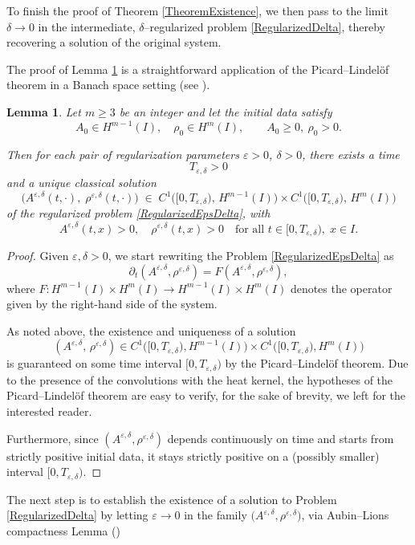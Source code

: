 \documentclass[12pt]{amsart}
\newtheorem{lemma}{Lemma}
\begin{document}
To finish the proof of Theorem \ref{TheoremExistence}, we then pass to the limit $\delta \to 0$ in the intermediate, $\delta$\nobreakdash–regularized problem \eqref{RegularizedDelta}, thereby recovering a solution of the original system.

The proof of Lemma \ref{LemmaExistenceEpsilon} is a straightforward application of the Picard--Lindel\"of theorem in a Banach space setting (see \cite{Hartman2002}).

	\begin{lemma}\label{LemmaExistenceEpsilon}
	Let $m\ge3$ be an integer and let the initial data satisfy
$$
A_0\in H^{m-1}(I),\quad \rho_0\in H^m(I), 
\qquad A_0\ge0,\ \rho_0>0.
$$

Then for each pair of regularization parameters $\varepsilon>0$, $\delta>0$, there exists a time
$$
T_{\varepsilon,\delta}>0
$$
and a unique classical solution
$$
\bigl(A^{\varepsilon,\delta}(t,\cdot),\;\rho^{\varepsilon,\delta}(t,\cdot)\bigr)
\;\in\;
C^1\bigl([0,T_{\varepsilon,\delta}),\,H^{m-1}(I)\bigr)
\times
C^1\bigl([0,T_{\varepsilon,\delta}),\,H^m(I)\bigr)
$$
of the regularized problem \eqref{RegularizedEpsDelta},
with
$$
A^{\varepsilon,\delta}(t,x)>0,\quad \rho^{\varepsilon,\delta}(t,x)>0
\quad\text{for all }t\in[0,T_{\varepsilon,\delta}),\;x\in I.
$$        
	\end{lemma}
	\begin{proof}
		Given $\varepsilon,\delta>0$,  we start rewriting the Problem  \eqref{RegularizedEpsDelta} as
		\begin{equation*}
			\partial_t (A^{\varepsilon,\delta},\rho^{\varepsilon,\delta})=F(A^{\varepsilon,\delta},\rho^{\varepsilon,\delta}),
		\end{equation*}
		where $F:H^{m-1}(I)\times H^m(I)\to H^{m-1}(I)\times H^{m}(I)$ denotes the operator given by the right-hand side of the system.
		
		As noted above, the existence and uniqueness of a solution
$$
(A^{\varepsilon,\delta},\,\rho^{\varepsilon,\delta}) 
\in C^1\bigl([0,T_{\varepsilon,\delta}),H^{m-1}(I)\bigr)\times
C^1\bigl([0,T_{\varepsilon,\delta}),H^{m}(I)\bigr)
$$
is guaranteed on some time interval $[0,T_{\varepsilon,\delta})$ by the Picard--Lindelöf theorem.  Due to the presence of the convolutions with the heat kernel, the hypotheses of the Picard--Lindelöf theorem are easy to verify, for the sake of brevity, we left for the interested reader.


		
		Furthermore, since $(A^{\varepsilon,\delta},\rho^{\varepsilon,\delta})$ depends continuously on time and starts from strictly positive initial data, it stays strictly positive on a (possibly smaller) interval $[0,T_{\varepsilon,\delta})$.
	\end{proof}
	The next step is to establish the existence of a solution to Problem \ref{RegularizedDelta} by letting $\varepsilon\to0$ in the family $\bigl(A^{\varepsilon,\delta},\rho^{\varepsilon,\delta}\bigr)$, via Aubin--Lions compactness Lemma (\cite[Corrollary 4]{Simon1986})
\end{document}
